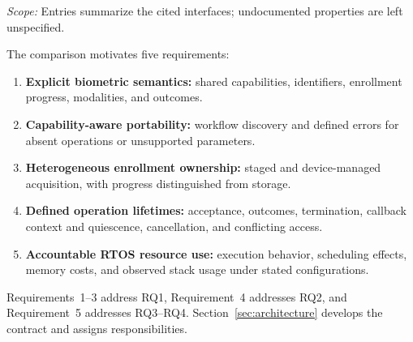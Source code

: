 \begin{table}[!t]
\par\smallskip
\begin{minipage}{\textwidth}
\footnotesize
\textit{Scope:} Entries summarize the cited interfaces; undocumented properties are left unspecified.
\end{minipage}
\end{table}

The comparison motivates five requirements:
\begin{enumerate}
\item \textbf{Explicit biometric semantics:} shared capabilities, identifiers, enrollment progress, modalities, and outcomes.
\item \textbf{Capability-aware portability:} workflow discovery and defined errors for absent operations or unsupported parameters.
\item \textbf{Heterogeneous enrollment ownership:} staged and device-managed acquisition, with progress distinguished from storage.
\item \textbf{Defined operation lifetimes:} acceptance, outcomes, termination, callback context and quiescence, cancellation, and conflicting access.
\item \textbf{Accountable RTOS resource use:} execution behavior, scheduling effects, memory costs, and observed stack usage under stated configurations.
\end{enumerate}

Requirements~1--3 address RQ1, Requirement~4 addresses RQ2, and Requirement~5 addresses RQ3--RQ4. Section~\ref{sec:architecture} develops the contract and assigns responsibilities.